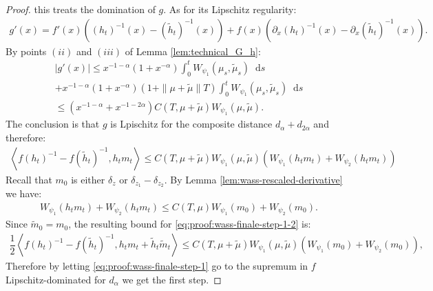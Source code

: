 \documentclass[11pt,a4paper]{article}
\newcommand{\RRP}{\mathbb{R}^+_*}
\newcommand{\MC}{\mathcal{M}}
\newcommand{\brac}[1]{\left\langle#1\right\rangle}
\newcommand{\dd}{\mathop{}\!\mathrm{d}}
\begin{document}
\begin{proof}
    this treats the domination of $g$. As for its Lipschitz regularity:
    \begin{align*}
        g'(x) = f'(x) \left((h_t)^{-1}(x) - (\tilde{h}_t)^{-1}(x)\right) + f(x) \left(\partial_x(h_t)^{-1}(x) - \partial_x(\tilde{h}_t)^{-1}(x)\right).
    \end{align*}
    By points $(ii)$ and $(iii)$ of Lemma \ref{lem:technical_G_h}:
    \begin{multline*}
        \left| g'(x) \right| \leq x^{-1-\alpha} \left(1 + x^{-\alpha} \right) \int_0^t W_{\psi_1}(\mu_s,\tilde{\mu}_s) \dd s \\
        +
        x^{-1-\alpha} \left(1 + x^{-\alpha} \right) \left(1 + \|\mu + \tilde{\mu}\|T\right) \int_0^t W_{\psi_1}(\mu_s,\tilde{\mu}_s) \dd s \\
        \leq \left(x^{-1-\alpha} + x^{-1-2\alpha}\right)C(T,\mu + \tilde{\mu}) W_{\psi_1}(\mu,\tilde{\mu}).
    \end{multline*}
    The conclusion is that $g$ is Lpischitz for the composite distance $d_{\alpha} + d_{2\alpha}$ and therefore:
    \begin{align*}
        \brac{f(h_t)^{-1} - f(\tilde{h}_t)^{-1},h_t m_t } \leq C(T,\mu + \tilde{\mu})W_{\psi_1}(\mu,\tilde{\mu})\left( W_{\psi_1}\left(h_t m_t\right) + W_{\psi_2}\left(h_t m_t\right)\right)
    \end{align*}
    Recall that $m_0$ is either $\delta_z$ or $\delta_{z_1}-\delta_{z_2}$. By Lemma \ref{lem:wass-rescaled-derivative} we have:
    \begin{align*}
        W_{\psi_1}\left(h_t m_t\right) + W_{\psi_2}\left(h_t m_t\right) \leq C(T,\mu) W_{\psi_1}\left(m_0\right) + W_{\psi_2}\left(m_0\right).
    \end{align*}
    Since $\tilde{m}_0 = m_0$, the resulting bound for \eqref{eq:proof:wass-finale-step-1-2} is:
    \begin{align*}
        \dfrac12\brac{f(h_t)^{-1} - f(\tilde{h}_t)^{-1},h_t m_t + \tilde{h}_t\tilde{m}_t}  \leq C(T,\mu + \tilde{\mu})W_{\psi_1}(\mu,\tilde{\mu})\left( W_{\psi_1}\left(m_0\right) + W_{\psi_2}\left(m_0\right)\right),
    \end{align*}
    Therefore by letting \eqref{eq:proof:wass-finale-step-1} go to the supremum in $f$ Lipschitz-dominated for $d_\alpha$ we get the first step.


\end{proof}
\end{document}
